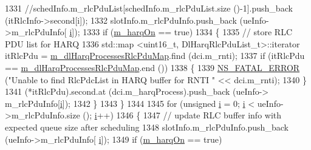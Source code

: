 \begin{DoxyCode}
1331                                 \textcolor{comment}{//schedInfo.m\_rlcPduList[schedInfo.m\_rlcPduList.size ()-1].push\_back
       (itRlcInfo->second[i]);}
1332                                 slotInfo.m\_rlcPduInfo.push\_back (ueInfo->m\_rlcPduInfo[
      \hyperlink{bernuolliDistribution_8m_a6f6ccfcf58b31cb6412107d9d5281426}{i}]);
1333                                 \textcolor{keywordflow}{if} (\hyperlink{classns3_1_1MmWaveFlexTtiPfMacScheduler_ab7edfa7baaf0e2ce6c2ba43efc59e291}{m\_harqOn} == \textcolor{keyword}{true})
1334                                 \{
1335                                         \textcolor{comment}{// store RLC PDU list for HARQ}
1336                                         std::map <uint16\_t, DlHarqRlcPduList\_t>::iterator itRlcPdu =  
      \hyperlink{classns3_1_1MmWaveFlexTtiPfMacScheduler_a9a0027a79dee0a60f04e55c25efb7ab7}{m\_dlHarqProcessesRlcPduMap}.find (dci.m\_rnti);
1337                                         \textcolor{keywordflow}{if} (itRlcPdu == 
      \hyperlink{classns3_1_1MmWaveFlexTtiPfMacScheduler_a9a0027a79dee0a60f04e55c25efb7ab7}{m\_dlHarqProcessesRlcPduMap}.end ())
1338                                         \{
1339                                                 \hyperlink{group__fatal_ga5131d5e3f75d7d4cbfd706ac456fdc85}{NS\_FATAL\_ERROR} (\textcolor{stringliteral}{"Unable to find RlcPdcList in
       HARQ buffer for RNTI "} << dci.m\_rnti);
1340                                         \}
1341                                         (*itRlcPdu).second.at (dci.m\_harqProcess).push\_back (ueInfo->
      m\_rlcPduInfo[\hyperlink{bernuolliDistribution_8m_a6f6ccfcf58b31cb6412107d9d5281426}{i}]);
1342                                 \}
1343                         \}
1344 
1345                         \textcolor{keywordflow}{for} (\textcolor{keywordtype}{unsigned} \hyperlink{bernuolliDistribution_8m_a6f6ccfcf58b31cb6412107d9d5281426}{i} = 0; \hyperlink{bernuolliDistribution_8m_a6f6ccfcf58b31cb6412107d9d5281426}{i} < ueInfo->m\_rlcPduInfo.size (); 
      \hyperlink{bernuolliDistribution_8m_a6f6ccfcf58b31cb6412107d9d5281426}{i}++)
1346                         \{
1347                                 \textcolor{comment}{// update RLC buffer info with expected queue size after scheduling}
1348                                 slotInfo.m\_rlcPduInfo.push\_back (ueInfo->m\_rlcPduInfo[
      \hyperlink{bernuolliDistribution_8m_a6f6ccfcf58b31cb6412107d9d5281426}{i}]);
1349                                 \textcolor{keywordflow}{if} (\hyperlink{classns3_1_1MmWaveFlexTtiPfMacScheduler_ab7edfa7baaf0e2ce6c2ba43efc59e291}{m\_harqOn} == \textcolor{keyword}{true})

\end{DoxyCode}
